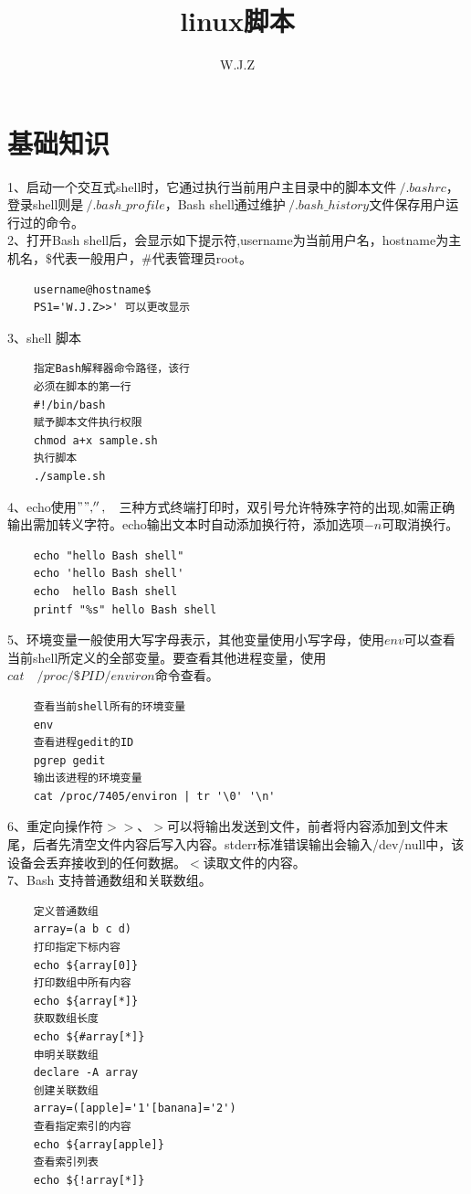 \documentclass[twocolumn]{article}
\title{linux脚本}
\author{W.J.Z}
\date{}
\begin{document}
	\maketitle
	\section{基础知识}
	1、启动一个交互式shell时，它通过执行当前用户主目录中的脚本文件$~/.bashrc$，登录shell则是$~/.bash\_profile$，Bash shell通过维护$~/.bash\_history$文件保存用户运行过的命令。
	\\

	2、打开Bash shell后，会显示如下提示符,username为当前用户名，hostname为主机名，$\$$代表一般用户，$\#$代表管理员root。
	\begin{lstlisting}
	username@hostname$
	PS1='W.J.Z>>' 可以更改显示
	\end{lstlisting}
	
	
	3、shell 脚本
	\begin{lstlisting}
	指定Bash解释器命令路径，该行
	必须在脚本的第一行
	#!/bin/bash
	赋予脚本文件执行权限
	chmod a+x sample.sh
	执行脚本
	./sample.sh 
	\end{lstlisting}
	
	4、echo使用$"",'',\quad  $三种方式终端打印时，双引号允许特殊字符的出现,如需正确输出需加转义字符。echo输出文本时自动添加换行符，添加选项$-n$可取消换行。
	\begin{lstlisting}
	echo "hello Bash shell"
	echo 'hello Bash shell'
	echo  hello Bash shell
	printf "%s" hello Bash shell
	\end{lstlisting}
	
	5、环境变量一般使用大写字母表示，其他变量使用小写字母，使用$env$可以查看当前shell所定义的全部变量。要查看其他进程变量，使用$cat \quad/proc/\$PID/environ$命令查看。
	
	\begin{lstlisting}
	查看当前shell所有的环境变量
	env  
	查看进程gedit的ID
	pgrep gedit 
	输出该进程的环境变量
	cat /proc/7405/environ | tr '\0' '\n'
	\end{lstlisting}
	
	6、重定向操作符$>> 、>$可以将输出发送到文件，前者将内容添加到文件末尾，后者先清空文件内容后写入内容。stderr标准错误输出会输入/dev/null中，该设备会丢弃接收到的任何数据。$<$读取文件的内容。
	\\
	
	7、Bash 支持普通数组和关联数组。
	\begin{lstlisting}
	定义普通数组
	array=(a b c d) 
	打印指定下标内容
	echo ${array[0]}
	打印数组中所有内容
	echo ${array[*]}
	获取数组长度
	echo ${#array[*]} 
	申明关联数组
	declare -A array
	创建关联数组
	array=([apple]='1'[banana]='2')
	查看指定索引的内容
	echo ${array[apple]}
	查看索引列表
	echo ${!array[*]}
	\end{lstlisting}
	
\end{document}
